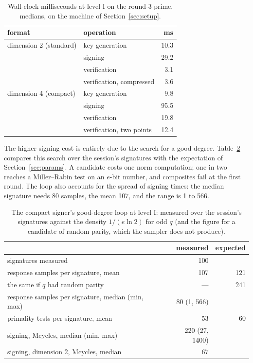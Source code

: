 \documentclass[version=preprint]{iacrcc}
\begin{document}
    \begin{table}[t]
        \centering
        \caption{Wall-clock milliseconds at level I on the round-3 prime, medians,
            on the machine of Section~\ref{sec:setup}.}
        \label{tab:ms}
        \small
        \setlength{\tabcolsep}{4pt}
        \begin{tabular}{l l r}
            \toprule
            format & operation & ms \\
            \midrule
            dimension 2 (standard) & key generation & 10.3 \\
            & signing & 29.2 \\
            & verification & 3.1 \\
            & verification, compressed & 3.6 \\
            \addlinespace
            dimension 4 (compact) & key generation & 9.8 \\
            & signing & 95.5 \\
            & verification & 19.8 \\
            & verification, two points & 12.4 \\
            \bottomrule
        \end{tabular}
    \end{table}

    The higher signing cost is entirely due to the search for a good degree.
    Table~\ref{tab:loop} compares this search over the session's signatures
    with the expectation of Section~\ref{sec:params}. A candidate costs one
    norm computation; one in two reaches a Miller--Rabin test on an $e$-bit
    number, and composites fail at the first round. The loop also accounts for
    the spread of signing times: the median signature needs 80 samples, the
    mean 107, and the range is 1 to 566.

    \begin{table}[t]
        \centering
        \caption{The compact signer's good-degree loop at level I: measured over
            the session's signatures against the density $1/(e \ln 2)$ for odd $q$
            (and the figure for a candidate of random parity, which the sampler does
            not produce).}
        \label{tab:loop}
        \begin{tabular}{l r r}
            \toprule
            & measured & expected \\
            \midrule
            signatures measured & 100 & \\
            response samples per signature, mean & 107 & 121 \\
            the same if $q$ had random parity & --- & 241 \\
            response samples per signature, median (min, max) & 80 (1, 566) & \\
            primality tests per signature, mean & 53 & 60 \\
            signing, Mcycles, median (min, max) & 220 (27, 1400) & \\
            signing, dimension 2, Mcycles, median & 67 & \\
            \bottomrule
        \end{tabular}
    \end{table}
\end{document}

